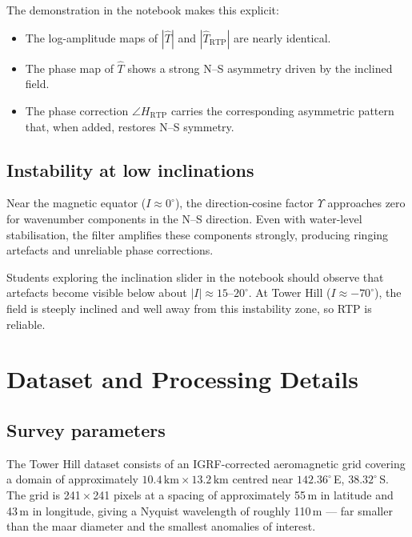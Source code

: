\documentclass[11pt,a4paper]{article}
\begin{document}
The demonstration in the notebook makes this explicit:
\begin{itemize}
  \item The log-amplitude maps of $|\hat{T}|$ and $|\hat{T}_\text{RTP}|$ are
        nearly identical.
  \item The phase map of $\hat{T}$ shows a strong N--S asymmetry driven by
        the inclined field.
  \item The phase correction $\angle H_\text{RTP}$ carries the corresponding
        asymmetric pattern that, when added, restores N--S symmetry.
\end{itemize}

\subsection{Instability at low inclinations}

Near the magnetic equator ($I \approx 0^\circ$), the direction-cosine factor
$\Upsilon$ approaches zero for wavenumber components in the N--S direction.
Even with water-level stabilisation, the filter amplifies these components
strongly, producing ringing artefacts and unreliable phase corrections.

Students exploring the inclination slider in the notebook should observe that
artefacts become visible below about $|I| \approx 15$--$20^\circ$.
At Tower Hill ($I \approx -70^\circ$), the field is steeply inclined and well
away from this instability zone, so RTP is reliable.

\section{Dataset and Processing Details}

\subsection{Survey parameters}

The Tower Hill dataset consists of an IGRF-corrected aeromagnetic grid
covering a domain of approximately $10.4\,\text{km} \times 13.2\,\text{km}$
centred near $142.36^\circ$\,E, $38.32^\circ$\,S.
The grid is 241\,$\times$\,241 pixels at a spacing of approximately
55\,m in latitude and 43\,m in longitude, giving a Nyquist wavelength of
roughly 110\,m --- far smaller than the maar diameter and the smallest
anomalies of interest.
\end{document}
